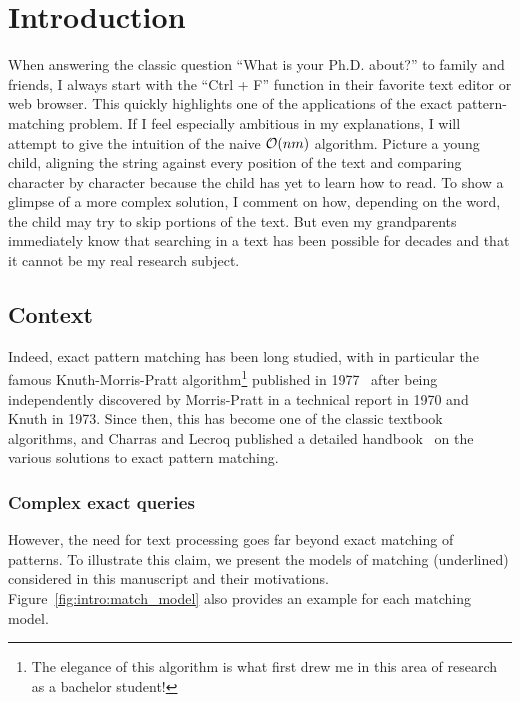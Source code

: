 \chapter*{Introduction}\label{chap:intro}

When answering the classic question ``What is your Ph.D. about?'' to family and friends, I always start with the ``Ctrl + F'' function in their favorite text editor or web browser. This quickly highlights one of the applications of the exact pattern-matching problem. If I feel especially ambitious in my explanations, I will attempt to give the intuition of the naive $\mathcal{O}(nm)$ algorithm. Picture a young child, aligning the string against every position of the text and comparing character by character because the child has yet to learn how to read. To show a glimpse of a more complex solution, I comment on how, depending on the word, the child may try to skip portions of the text. But even my grandparents immediately know that searching in a text has been possible for decades and that it cannot be my real research subject.

\section{Context}

Indeed, exact pattern matching has been long studied, with in particular the famous Knuth-Morris-Pratt algorithm\footnote{The elegance of this algorithm is what first drew me in this area of research as a bachelor student!} published in 1977~\cite{KMP} after being independently discovered by Morris-Pratt in a technical report in 1970 and Knuth in 1973. Since then, this has become one of the classic textbook algorithms, and Charras and Lecroq published a detailed handbook~\cite{charras2004handbook} on the various solutions to exact pattern matching.

\subsection{Complex exact queries} 



However, the need for text processing goes far beyond exact matching of patterns. To illustrate this claim, we present the models of matching (underlined) considered in this manuscript and their motivations. Figure~\ref{fig:intro:match_model} also provides an example for each matching model.



